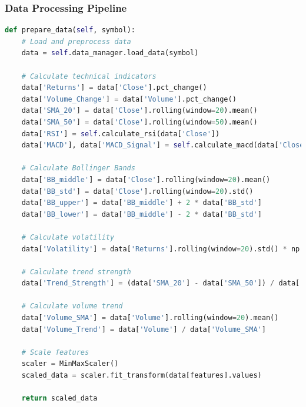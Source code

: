 \documentclass[conference]{IEEEtran}
\begin{document}
\subsubsection{Data Processing Pipeline}
\begin{lstlisting}[language=Python]
def prepare_data(self, symbol):
    # Load and preprocess data
    data = self.data_manager.load_data(symbol)
    
    # Calculate technical indicators
    data['Returns'] = data['Close'].pct_change()
    data['Volume_Change'] = data['Volume'].pct_change()
    data['SMA_20'] = data['Close'].rolling(window=20).mean()
    data['SMA_50'] = data['Close'].rolling(window=50).mean()
    data['RSI'] = self.calculate_rsi(data['Close'])
    data['MACD'], data['MACD_Signal'] = self.calculate_macd(data['Close'])
    
    # Calculate Bollinger Bands
    data['BB_middle'] = data['Close'].rolling(window=20).mean()
    data['BB_std'] = data['Close'].rolling(window=20).std()
    data['BB_upper'] = data['BB_middle'] + 2 * data['BB_std']
    data['BB_lower'] = data['BB_middle'] - 2 * data['BB_std']
    
    # Calculate volatility
    data['Volatility'] = data['Returns'].rolling(window=20).std() * np.sqrt(252)
    
    # Calculate trend strength
    data['Trend_Strength'] = (data['SMA_20'] - data['SMA_50']) / data['SMA_50']
    
    # Calculate volume trend
    data['Volume_SMA'] = data['Volume'].rolling(window=20).mean()
    data['Volume_Trend'] = data['Volume'] / data['Volume_SMA']
    
    # Scale features
    scaler = MinMaxScaler()
    scaled_data = scaler.fit_transform(data[features].values)
    
    return scaled_data
\end{lstlisting}
\end{document}
